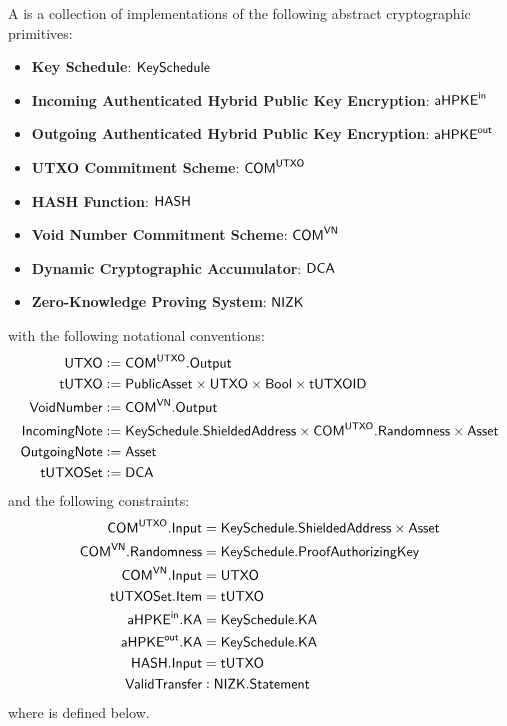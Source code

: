\begin{definition}
    A \TransferConfiguration{} is a collection of implementations of the following abstract cryptographic primitives:
    \begin{itemize}
        \item \textbf{Key Schedule}: ${\textsf{KeySchedule}}$
        \item \textbf{Incoming Authenticated Hybrid Public Key Encryption}: ${{\textsf{aHPKE}}^\textsf{in}}$
        \item \textbf{Outgoing Authenticated Hybrid Public Key Encryption}: ${{\textsf{aHPKE}}^\textsf{out}}$
        \item \textbf{UTXO Commitment Scheme}: ${\textsf{COM}}^{{\textsf{UTXO}}}$
        \item \textbf{HASH Function}: ${\textsf{HASH}}{}$
        \item \textbf{Void Number Commitment Scheme}: ${\textsf{COM}}^{{\textsf{VN}}}$
        \item \textbf{Dynamic Cryptographic Accumulator}: ${\textsf{DCA}}$
        \item \textbf{Zero-Knowledge Proving System}: ${\textsf{NIZK}}$
    \end{itemize}
    with the following notational conventions:
    \begin{align*}
        {\textsf{UTXO}}         &:= {\textsf{COM}}^{{\textsf{UTXO}}}.{\textsf{Output}} \\
        {\textsf{tUTXO}}        &:= {\textsf{PublicAsset}} \times {\textsf{UTXO}} \times {\textsf{Bool}} \times {\textsf{tUTXOID}} \\
        {\textsf{VoidNumber}}   &:= {\textsf{COM}}^{{\textsf{VN}}}.{\textsf{Output}} \\
        {\textsf{IncomingNote}} &:= {\textsf{KeySchedule}}.{\textsf{ShieldedAddress}} \times {\textsf{COM}}^{\textsf{UTXO}}.{\textsf{Randomness}} \times {\textsf{Asset}} \\
        {\textsf{OutgoingNote}} &:= {\textsf{Asset}} \\
        {\textsf{tUTXOSet}}     &:= {\textsf{DCA}}
    \end{align*}
    and the following constraints:
    \begin{align*}
        {\textsf{COM}}^{{\textsf{UTXO}}}.{\textsf{Input}}    &= {\textsf{KeySchedule}}.{\textsf{ShieldedAddress}} \times {\textsf{Asset}} \\
        {\textsf{COM}}^{{\textsf{VN}}}.{\textsf{Randomness}} &= {\textsf{KeySchedule}}.{\textsf{ProofAuthorizingKey}} \\
        {\textsf{COM}}^{{\textsf{VN}}}.{\textsf{Input}}      &= {\textsf{UTXO}} \\
        {\textsf{tUTXOSet}}.{\textsf{Item}}        &= {\textsf{tUTXO}} \\
        {{\textsf{aHPKE}}^\textsf{in}}.{\textsf{KA}}           &= {\textsf{KeySchedule}}.{\textsf{KA}} \\
        {{\textsf{aHPKE}}^\textsf{out}}.{\textsf{KA}}          &= {\textsf{KeySchedule}}.{\textsf{KA}} \\
        {\textsf{HASH}}.{\textsf{Input}} &= {\textsf{tUTXO}} \\
        {\textsf{ValidTransfer}}         &: {\textsf{NIZK}}.{\textsf{Statement}} 
    \end{align*}
    where \ValidTransfer{} is defined below.
\end{definition}

